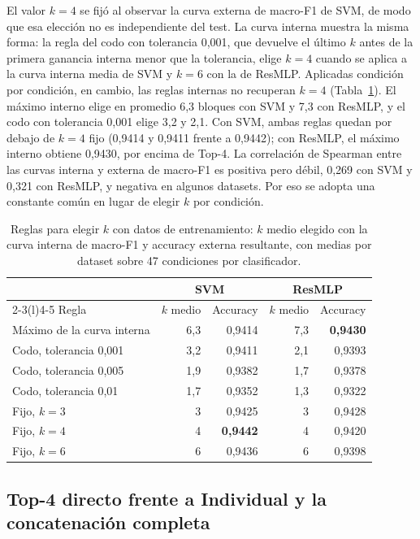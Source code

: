 \documentclass[a4paper,fleqn]{cas-sc}
\begin{document}
El valor $k=4$ se fijó al observar la curva externa de macro-F1 de SVM, de modo que esa elección no es independiente del test. La curva interna muestra la misma forma: la regla del codo con tolerancia 0,001, que devuelve el último $k$ antes de la primera ganancia interna menor que la tolerancia, elige $k=4$ cuando se aplica a la curva interna media de SVM y $k=6$ con la de ResMLP. Aplicadas condición por condición, en cambio, las reglas internas no recuperan $k=4$ (Tabla~\ref{tab:reglas-k}). El máximo interno elige en promedio 6,3 bloques con SVM y 7,3 con ResMLP, y el codo con tolerancia 0,001 elige 3,2 y 2,1. Con SVM, ambas reglas quedan por debajo de $k=4$ fijo (0,9414 y 0,9411 frente a 0,9442); con ResMLP, el máximo interno obtiene 0,9430, por encima de Top-4. La correlación de Spearman entre las curvas interna y externa de macro-F1 es positiva pero débil, 0,269 con SVM y 0,321 con ResMLP, y negativa en algunos datasets. Por eso se adopta una constante común en lugar de elegir $k$ por condición.

\begin{table}[pos=htbp]
\centering
\caption{Reglas para elegir $k$ con datos de entrenamiento: $k$ medio elegido con la curva interna de macro-F1 y accuracy externa resultante, con medias por dataset sobre 47 condiciones por clasificador.}
\label{tab:reglas-k}
\small
\begin{tabular}{@{}lrrrr@{}}
\toprule
 & \multicolumn{2}{c}{SVM} & \multicolumn{2}{c}{ResMLP} \\
\cmidrule(lr){2-3}\cmidrule(l){4-5}
Regla & $k$ medio & Accuracy & $k$ medio & Accuracy \\
\midrule
Máximo de la curva interna & 6,3 & 0,9414 & 7,3 & \textbf{0,9430} \\
Codo, tolerancia 0,001 & 3,2 & 0,9411 & 2,1 & 0,9393 \\
Codo, tolerancia 0,005 & 1,9 & 0,9382 & 1,7 & 0,9378 \\
Codo, tolerancia 0,01 & 1,7 & 0,9352 & 1,3 & 0,9322 \\
\addlinespace
Fijo, $k=3$ & 3 & 0,9425 & 3 & 0,9428 \\
Fijo, $k=4$ & 4 & \textbf{0,9442} & 4 & 0,9420 \\
Fijo, $k=6$ & 6 & 0,9436 & 6 & 0,9398 \\
\bottomrule
\end{tabular}
\end{table}
\FloatBarrier

\subsection{Top-4 directo frente a Individual y la concatenación completa}\label{sec:top4}
\end{document}
